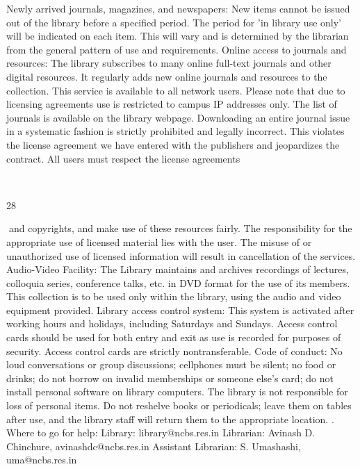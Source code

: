 \documentclass[a4paper,10pt]{article}
\begin{document}
Newly arrived journals, magazines, and newspapers: New items cannot be issued out of
the library before a specified period. The period for 'in library use only' will be indicated on
each item. This will vary and is determined by the librarian from the general pattern of use
and requirements.
Online access to journals and resources: The library subscribes to many online full-text
journals and other digital resources. It regularly adds new online journals and resources to
the collection. This service is available to all network users. Please note that due to licensing
agreements use is restricted to campus IP addresses only. The list of journals is available on
the library webpage. Downloading an entire journal issue in a systematic fashion is strictly
prohibited and legally incorrect. This violates the license agreement we have entered with
the publishers and jeopardizes the contract. All users must respect the license agreements
	
  

28	
  

and copyrights, and make use of these resources fairly. The responsibility for the appropriate
use of licensed material lies with the user. The misuse of or unauthorized use of licensed
information will result in cancellation of the services.
Audio-Video Facility: The Library maintains and archives recordings of lectures, colloquia
series, conference talks, etc. in DVD format for the use of its members. This collection is to
be used only within the library, using the audio and video equipment provided.
Library access control system: This system is activated after working hours and holidays,
including Saturdays and Sundays. Access control cards should be used for both entry and
exit as use is recorded for purposes of security. Access control cards are strictly nontransferable.
Code of conduct: No loud conversations or group discussions; cellphones must be silent; no
food or drinks; do not borrow on invalid memberships or someone else’s card; do not install
personal software on library computers. The library is not responsible for loss of personal
items. Do not reshelve books or periodicals; leave them on tables after use, and the library
staff will return them to the appropriate location.
.
Where to go for help:
Library: library@ncbs.res.in
Librarian: Avinash D. Chinchure, avinashdc@ncbs.res.in
Assistant Librarian: S. Umashashi, uma@ncbs.res.in
\end{document}
